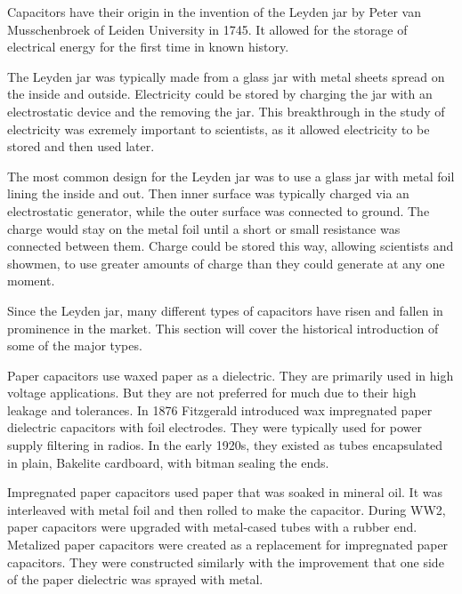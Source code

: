 \noindent Capacitors have their origin in the invention of the Leyden jar by Peter van Musschenbroek of Leiden University in 1745. \cite{empLight} It allowed for the storage of electrical energy for the first time in known history. 

\noindent The Leyden jar was typically made from a glass jar with metal sheets spread on the inside and outside. Electricity could be stored by charging the jar with an electrostatic device and the removing the jar. This breakthrough in the study of electricity was exremely important to scientists, as it allowed electricity to be stored and then used later.
\cite{ieee_hist} 

\noindent The most common design for the Leyden jar was to use a glass jar with metal foil lining the inside and out. Then inner surface was typically charged via an electrostatic generator, while the outer surface was connected to ground. The charge would stay on the metal foil until a short or small resistance was connected between them. Charge could be stored this way, allowing scientists and showmen, to use greater amounts of charge than they could generate at any one moment.

\noindent Since the Leyden jar, many different types of capacitors have risen and fallen in prominence in the market. This section will cover the historical introduction of some of the major types.

\noindent Paper capacitors use waxed paper as a dielectric. They are primarily used in high voltage applications. But they are not preferred for much due to their high leakage and tolerances.\cite{learn_caps} In 1876 Fitzgerald introduced wax impregnated paper dielectric capacitors with foil electrodes.\cite[ch.~11]{dumInv} \cite{learn_caps} They were typically used for power supply filtering in radios. In the early 1920s, they existed as tubes encapsulated in plain, Bakelite cardboard, with bitman sealing the ends.\cite[ch~3]{dumInv}

\noindent Impregnated paper capacitors used paper that was soaked in mineral oil. It was interleaved with metal foil and then rolled to make the capacitor.\cite[ch.~8.2.1.1]{poorIntro} \noindent During WW2, paper capacitors were upgraded with metal-cased tubes with a rubber end.\cite[ch.~8.1]{poorIntro} Metalized paper capacitors were created as a replacement for impregnated paper capacitors. They were constructed similarly with the improvement that one side of the paper dielectric was sprayed with metal.\cite{hist_cerFilt}

